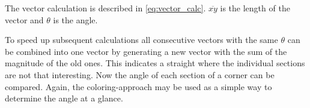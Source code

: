 The vector calculation is described in \ref{eq:vector_calc}. $\overline{xy}$ is the length of the vector and $\theta$ is the angle.

To speed up subsequent calculations all consecutive vectors with the same $\theta$ can be combined into one vector by generating a new vector with the sum of the magnitude of the old ones. This indicates a straight where the individual sections are not that interesting.
Now the angle of each section of a corner can be compared. Again, the coloring-approach may be used as a simple way to determine the angle at a glance.
\clearpage
